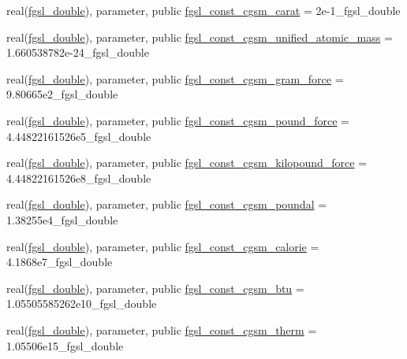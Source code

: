 \begin{DoxyCompactItemize}
\item 
real(\hyperlink{namespacefgsl_a9af5113378e0f000eb479d3f90196ddf}{fgsl\+\_\+double}), parameter, public \hyperlink{namespacefgsl_a239136f12feacdcaf3bc528ccb0c492f}{fgsl\+\_\+const\+\_\+cgsm\+\_\+carat} = 2e-\/1\+\_\+fgsl\+\_\+double
\item 
real(\hyperlink{namespacefgsl_a9af5113378e0f000eb479d3f90196ddf}{fgsl\+\_\+double}), parameter, public \hyperlink{namespacefgsl_a6b7f3fbb6b2b1c225cab4719706b6d59}{fgsl\+\_\+const\+\_\+cgsm\+\_\+unified\+\_\+atomic\+\_\+mass} = 1.\+660538782e-\/24\+\_\+fgsl\+\_\+double
\item 
real(\hyperlink{namespacefgsl_a9af5113378e0f000eb479d3f90196ddf}{fgsl\+\_\+double}), parameter, public \hyperlink{namespacefgsl_a1ba32b331b50764a4e448e8020526104}{fgsl\+\_\+const\+\_\+cgsm\+\_\+gram\+\_\+force} = 9.\+80665e2\+\_\+fgsl\+\_\+double
\item 
real(\hyperlink{namespacefgsl_a9af5113378e0f000eb479d3f90196ddf}{fgsl\+\_\+double}), parameter, public \hyperlink{namespacefgsl_a42219a1cda342fbf61675de1c4fa2e9a}{fgsl\+\_\+const\+\_\+cgsm\+\_\+pound\+\_\+force} = 4.\+44822161526e5\+\_\+fgsl\+\_\+double
\item 
real(\hyperlink{namespacefgsl_a9af5113378e0f000eb479d3f90196ddf}{fgsl\+\_\+double}), parameter, public \hyperlink{namespacefgsl_aca0248b47e63c840ed0ab430927008f1}{fgsl\+\_\+const\+\_\+cgsm\+\_\+kilopound\+\_\+force} = 4.\+44822161526e8\+\_\+fgsl\+\_\+double
\item 
real(\hyperlink{namespacefgsl_a9af5113378e0f000eb479d3f90196ddf}{fgsl\+\_\+double}), parameter, public \hyperlink{namespacefgsl_a4453ec263f2b4c5802122e762e1672c4}{fgsl\+\_\+const\+\_\+cgsm\+\_\+poundal} = 1.\+38255e4\+\_\+fgsl\+\_\+double
\item 
real(\hyperlink{namespacefgsl_a9af5113378e0f000eb479d3f90196ddf}{fgsl\+\_\+double}), parameter, public \hyperlink{namespacefgsl_a82882b4ac09d9b5f5cd25cff0daa2119}{fgsl\+\_\+const\+\_\+cgsm\+\_\+calorie} = 4.\+1868e7\+\_\+fgsl\+\_\+double
\item 
real(\hyperlink{namespacefgsl_a9af5113378e0f000eb479d3f90196ddf}{fgsl\+\_\+double}), parameter, public \hyperlink{namespacefgsl_a01479e6b5bfdbc02efb80e985ca837a6}{fgsl\+\_\+const\+\_\+cgsm\+\_\+btu} = 1.\+05505585262e10\+\_\+fgsl\+\_\+double
\item 
real(\hyperlink{namespacefgsl_a9af5113378e0f000eb479d3f90196ddf}{fgsl\+\_\+double}), parameter, public \hyperlink{namespacefgsl_a3a73d93cd550287bba936f1fe898b44b}{fgsl\+\_\+const\+\_\+cgsm\+\_\+therm} = 1.\+05506e15\+\_\+fgsl\+\_\+double

\end{DoxyCompactItemize}
